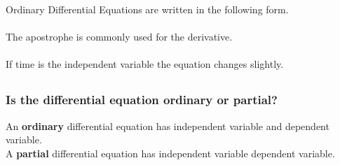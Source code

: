 \documentclass[fleqn]{beamer} %
\newcommand{\sectionIsubsectionIItitle}{}
\newcommand{\sectionIsubsectionIIItitle}{}
\begin{document}
			\begin{frame}
				\frametitle{\sectionIsubsectionIItitle} \small
				\bigskip

				  Ordinary Differential Equations are written in the following form.\vspace{3mm}\\

	\vspace{0mm}\\		

The apostrophe is commonly used for the derivative. \vspace{2mm}\\

 \vspace{3mm}\\

If time is the independent variable the equation changes slightly. \vspace{2mm}\\

				
				\btVFill
			\end{frame}


		\subsection{\sectionIsubsectionIIItitle}\label{sectionIsubsectionIII}
			\begin{frame} 
				\frametitle{\sectionIsubsectionIIItitle}
				\bigskip

				\frametitle{Is the differential equation ordinary or partial?}

An {\bf ordinary} differential equation has \underline{\hspace{20mm}} independent \vspc variable and \underline{\hspace{20mm}} dependent variable. \vspace{10mm}\\

A {\bf partial} differential equation has \underline{\hspace{50mm}} \vspc independent variable  \underline{\hspace{20mm}}  dependent variable. \vspace{10mm}\\

				
				\btVFill
			\end{frame}	
\end{document}
